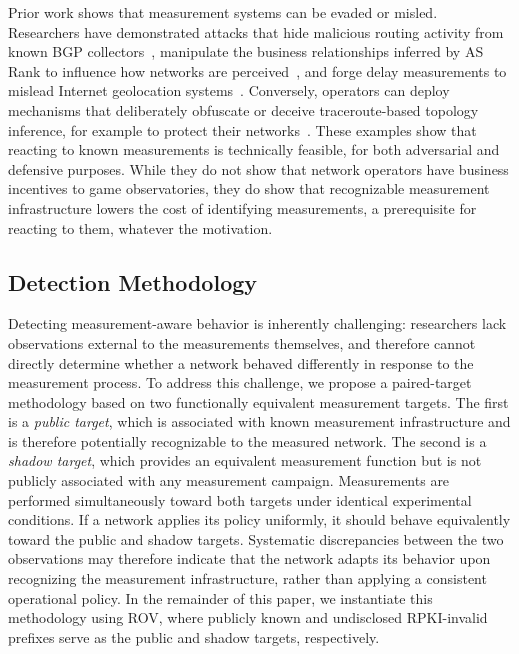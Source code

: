 \documentclass[sigconf, 10pt]{acmart}
\begin{document}
Prior work shows that measurement systems can be evaded or misled. Researchers have demonstrated attacks that hide malicious routing activity from known BGP collectors~\cite{global_bgp_attacks,sico}, manipulate the business relationships inferred by AS Rank to influence how networks are perceived~\cite{asrogue}, and forge delay measurements to mislead Internet geolocation systems~\cite{geolocation}. Conversely, operators can deploy mechanisms that deliberately obfuscate or deceive traceroute-based topology inference, for example to protect their networks~\cite{nethide,topologydeception}. These examples show that reacting to known measurements is technically feasible, for both adversarial and defensive purposes. While they do not show that network operators have business incentives to game observatories, they do show that recognizable measurement infrastructure lowers the cost of identifying measurements, a prerequisite for reacting to them, whatever the motivation.

\subsection{Detection Methodology}

Detecting measurement-aware behavior is inherently challenging: researchers lack observations external to the measurements themselves, and therefore cannot directly determine whether a network behaved differently in response to the measurement process. To address this challenge, we propose a paired-target methodology based on two functionally equivalent measurement targets. The first is a \emph{public target}, which is associated with known measurement infrastructure and is therefore potentially recognizable to the measured network. The second is a \emph{shadow target}, which provides an equivalent measurement function but is not publicly associated with any measurement campaign. Measurements are performed simultaneously toward both targets under identical experimental conditions. If a network applies its policy uniformly, it should behave equivalently toward the public and shadow targets. Systematic discrepancies between the two observations may therefore indicate that the network adapts its behavior upon recognizing the measurement infrastructure, rather than applying a consistent operational policy. In the remainder of this paper, we instantiate this methodology using ROV, where publicly known and undisclosed RPKI-invalid prefixes serve as the public and shadow targets, respectively.
\end{document}
